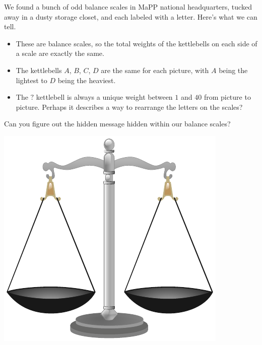 


We found a bunch of odd balance scales in MaPP national headquarters,
tucked away in a dusty storage closet, and each labeled with a letter.
Here's what we can tell.

  \begin{itemize}
  \item These are balance scales, so the total weights of the kettlebells
        on each side of a scale are exactly the same.
  \item The kettlebells $A$, $B$, $C$, $D$ are the same for each picture,
        with $A$ being the lightest to $D$ being the heaviest.
  \item The $?$ kettlebell is always a unique weight between $1$ and $40$ from
        picture to picture. Perhaps it describes a way
        to rearrange the letters on the scales?
  \end{itemize}

\noindent
Can you figure out the hidden message hidden within our balance scales?

\begin{center}
\includegraphics[width=0.6\linewidth]{assets/balancing-act/balanceScale.pdf}
\end{center}




  \newpage

